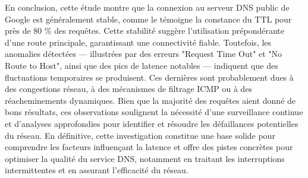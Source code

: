 
\newpage 
\fancyhead[l]{}
\renewcommand{\thepage}{\MakeUppercase{\roman{page}}}
\setcounter{page}{5}
\newpage 
\vspace{0.2cm}\vspace{0.4cm}

En conclusion, cette étude montre que la connexion au serveur DNS public de Google est généralement stable, comme le témoigne la constance du TTL pour près de 80 \% des requêtes. Cette stabilité suggère l’utilisation prépondérante d’une route principale, garantissant une connectivité fiable. Toutefois, les anomalies détectées — illustrées par des erreurs "Request Time Out" et "No Route to Host", ainsi que des pics de latence notables — indiquent que des fluctuations temporaires se produisent. Ces dernières sont probablement dues à des congestions réseau, à des mécanismes de filtrage ICMP ou à des réacheminements dynamiques. Bien que la majorité des requêtes aient donné de bons résultats, ces observations soulignent la nécessité d’une surveillance continue et d’analyses approfondies pour identifier et résoudre les défaillances potentielles du réseau. En définitive, cette investigation constitue une base solide pour comprendre les facteurs influençant la latence et offre des pistes concrètes pour optimiser la qualité du service DNS, notamment en traitant les interruptions intermittentes et en assurant l’efficacité du réseau.

\newpage


